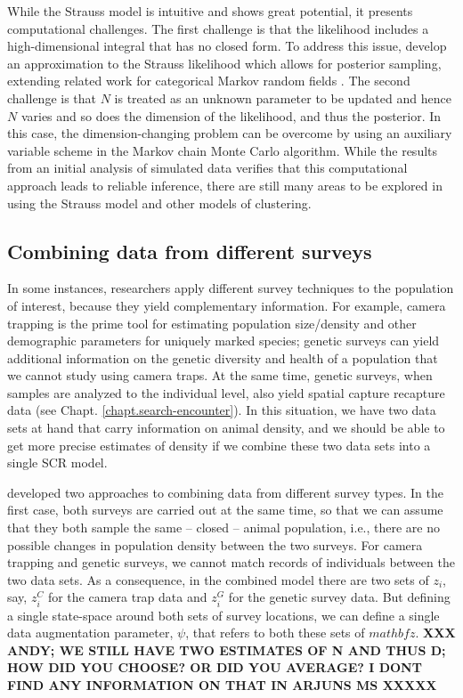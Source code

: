 \begin{table}[ht]
While the Strauss model is intuitive and shows great potential, it
presents computational challenges.  The first challenge is that the
likelihood includes a high-dimensional integral that has no closed
form.  To address this issue, \citet{rreich_etal:2012} develop an
approximation to the Strauss likelihood which allows for posterior
sampling, extending related work for categorical Markov random fields
\citep{green_richardson:2002,smith_smith:2006}.  The second challenge
is that $N$ is treated as an unknown parameter to be updated and hence
$N$ varies and so does the dimension of the likelihood, and thus the
posterior.  In this case, the dimension-changing problem can be
overcome by using an auxiliary variable scheme in the Markov chain
Monte Carlo algorithm.
While the results from an initial analysis of simulated data verifies
that this computational approach leads to reliable inference, there
are still many areas to be explored in using the Strauss model and
other models of clustering.


\subsection{Combining data from different surveys}

In some instances, researchers apply different survey techniques to
the population of interest, because they yield complementary
information. For example, camera trapping is the prime tool for
estimating population size/density and other demographic parameters
for uniquely marked species; genetic surveys can yield additional
information on the genetic diversity and health of a population that
we cannot study using camera traps. At the same time, genetic surveys,
when samples are analyzed to the individual level, also yield spatial
capture recapture data (see Chapt. \ref{chapt.search-encounter}). In
this situation, we have two data sets at hand that carry information
on animal density, and we should be able to get more precise estimates
of density if we combine these two data sets into a single SCR model.

\citet{gopalaswamy_etal:2012mee} developed two approaches to combining
data from different survey types. In the first case, both surveys are
carried out at the same time, so that we can assume that they both
sample the same -- closed -- animal population, i.e., there are no
possible changes in population density between the two surveys. For
camera trapping and genetic surveys, we cannot match records of
individuals between the two data sets. As a consequence, in the
combined model there are two sets of $z_i$, say, $z^{C}_{i}$ for the
camera trap data and $z^{G}_{i}$ for the genetic survey data. But
defining a single state-space around both sets of survey locations, we
can define a single data augmentation parameter, $\psi$, that refers to
both these sets of $mathbf{z}$.  {\bf XXX ANDY; WE STILL HAVE TWO ESTIMATES
OF N AND THUS D; HOW DID YOU CHOOSE? OR DID YOU AVERAGE? I DONT FIND
ANY INFORMATION ON THAT IN ARJUNS MS XXXXX}


\end{table}
